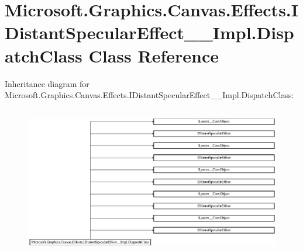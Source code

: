 \hypertarget{class_microsoft_1_1_graphics_1_1_canvas_1_1_effects_1_1_i_distant_specular_effect_____impl_1_1_dispatch_class}{}\section{Microsoft.\+Graphics.\+Canvas.\+Effects.\+I\+Distant\+Specular\+Effect\+\_\+\+\_\+\+Impl.\+Dispatch\+Class Class Reference}
\label{class_microsoft_1_1_graphics_1_1_canvas_1_1_effects_1_1_i_distant_specular_effect_____impl_1_1_dispatch_class}
Inheritance diagram for Microsoft.\+Graphics.\+Canvas.\+Effects.\+I\+Distant\+Specular\+Effect\+\_\+\+\_\+\+Impl.\+Dispatch\+Class\+:\begin{figure}[H]
\begin{center}
\leavevmode
\includegraphics[height=6.595289cm]{class_microsoft_1_1_graphics_1_1_canvas_1_1_effects_1_1_i_distant_specular_effect_____impl_1_1_dispatch_class}
\end{center}
\end{figure}
